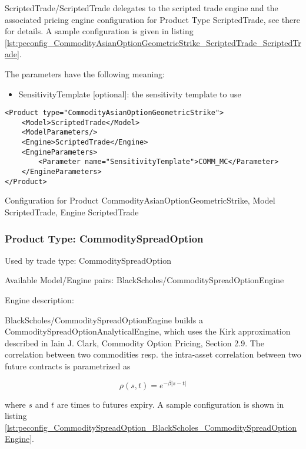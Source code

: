 ScriptedTrade/ScriptedTrade delegates to the scripted trade engine and the associated pricing engine configuration for
Product Type ScriptedTrade, see there for details. A sample configuration is given in listing
\ref{lst:peconfig_CommodityAsianOptionGeometricStrike_ScriptedTrade_ScriptedTrade}.

The parameters have the following meaning:

\begin{itemize}
\item SensitivityTemplate [optional]: the sensitivity template to use 
\end{itemize}

\begin{longlisting}
\begin{verbatim}
<Product type="CommodityAsianOptionGeometricStrike">
    <Model>ScriptedTrade</Model>
    <ModelParameters/>
    <Engine>ScriptedTrade</Engine>
    <EngineParameters>
        <Parameter name="SensitivityTemplate">COMM_MC</Parameter>
    </EngineParameters>
</Product>
\end{verbatim}
\caption{Configuration for Product CommodityAsianOptionGeometricStrike, Model ScriptedTrade, Engine ScriptedTrade}
\label{lst:peconfig_CommodityAsianOptionGeometricStrike_ScriptedTrade_ScriptedTrade}
\end{longlisting}

\subsubsection{Product Type: CommoditySpreadOption}

Used by trade type: CommoditySpreadOption

Available Model/Engine pairs: BlackScholes/CommoditySpreadOptionEngine

Engine description:

BlackScholes/CommoditySpreadOptionEngine builds a CommoditySpreadOptionAnalyticalEngine, which uses the Kirk
approximation described in Iain J. Clark, Commodity Option Pricing, Section 2.9. The correlation between two commodities
resp. the intra-asset correlation between two future contracts is parametrized as

$$\rho(s, t) = e^{-\beta |s-t|}$$

where $s$ and $t$ are times to futures expiry. A sample configuration is shown in listing
\ref{lst:peconfig_CommoditySpreadOption_BlackScholes_CommoditySpreadOptionEngine}.

